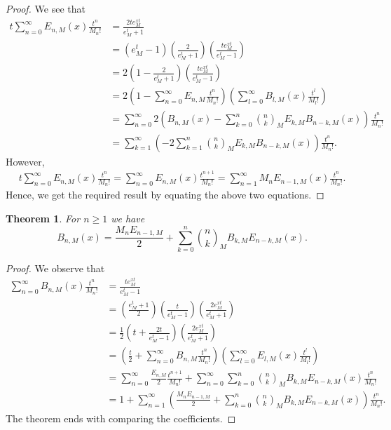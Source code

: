 \documentclass[12pt, a4paper]{article}
\newtheorem{theorem}{Theorem}[section]
\begin{document}
\begin{proof}
We see that
\begin{align*}
t\sum_{n=0}^{\infty}E_{n,M}(x)\frac{t^n}{M_n!}& = \frac{2te^{xt}_M}{e^t_M+1}\\
&= \left(e^t_M-1\right)\left(\frac{2}{e^t_M+1}\right)\left(\frac{te^{xt}_M}{e^t_M-1}\right)\\
&= 2\left(1-\frac{2}{e^t_M+1}\right)\left(\frac{te^{xt}_M}{e^t_M-1}\right)\\
&= 2\left(1-\sum_{n=0}^{\infty}E_{n,M}\frac{t^n}{M_n!}\right)\left(\sum_{l=0}^{\infty}B_{l,M}(x)\frac{t^l}{M_l!}\right)\\
&= \sum_{n=0}^{\infty}2\left(B_{n,M}(x)-\sum_{k=0}^{n}\binom{n}{k}_ME_{k,M}B_{n-k,M}(x)\right)\frac{t^n}{M_{n}!}\\
&= \sum_{k=1}^{\infty}\left(-2\sum_{k=1}^{n}\binom{n}{k}_ME_{k,M}B_{n-k,M}(x)\right)\frac{t^n}{M_n!}.
\end{align*}
However,
\begin{align*}
t\sum_{n=0}^{\infty}E_{n,M}(x)\frac{t^n}{M_n!} = \sum_{n=0}^{\infty}E_{n,M}(x)\frac{t^{n+1}}{M_n!}
= \sum_{n=1}^{\infty}M_{n}E_{n-1,M}(x)\frac{t^n}{M_n!}.
\end{align*}
Hence, we get the required result by equating the above two equations.
\end{proof}
\begin{theorem}
For $n \geq 1$ we have
\begin{equation*}
B_{n,M}(x) = \frac{M_nE_{n-1,M}}{2}+\sum_{k=0}^{n}\binom{n}{k}_MB_{k,M}E_{n-k,M}(x).
\end{equation*}
\end{theorem}
\begin{proof}
We observe that
\begin{align*}
\sum_{n=0}^{\infty}B_{n,M}(x)\frac{t^n}{M_n!} &= \frac{te^{xt}_M}{e^t_M-1}\\
&= \left(\frac{e^t_M+1}{2}\right)\left(\frac{t}{e^t_M-1}\right)\left(\frac{2e^{xt}_M}{e^t_M+1}\right)\\
&= \frac{1}{2}\left(t+\frac{2t}{e^t_M-1}\right)\left(\frac{2e^{xt}_M}{e^t_M+1}\right)\\
&=\left(\frac{t}{2}+ \sum_{n=0}^{\infty}B_{n,M}\frac{t^n}{M_n!}\right)\left(\sum_{l=0}^{\infty}E_{l,M}(x)\frac{t^l}{M_l!}\right)\\
&= \sum_{n=0}^{\infty}\frac{E_{n,M}}{2}\frac{t^{n+1}}{M_n!}+
\sum_{n=0}^{\infty}\sum_{k=0}^{n}\binom{n}{k}_MB_{k,M}E_{n-k,M}(x)\frac{t^{n}}{M_n!}\\
& = 1 + \sum_{n=1}^{\infty}\left(\frac{M_nE_{n-1,M}}{2}+\sum_{k=0}^{n}\binom{n}{k}_MB_{k,M}E_{n-k,M}(x)\right)\frac{t^{n}}{M_n!}.
\end{align*}
The theorem ends with comparing the coefficients.
\end{proof}
\end{document}
